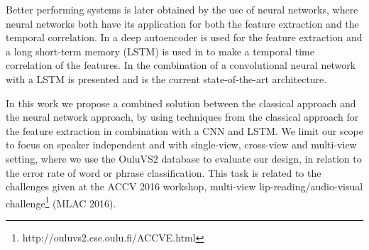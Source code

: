 Better performing systems is later obtained by the use of neural networks, where neural networks both have its application for both the feature extraction and the temporal correlation.
In \cite{Ngiam2011} a deep autoencoder is used for the feature extraction and a long short-term memory (LSTM) is used in \cite{Wand2016} to make a temporal time correlation of the features.
In \cite{Lee} the combination of a convolutional neural network with a LSTM is presented and is the current state-of-the-art architecture.

In this work we propose a combined solution between the classical approach and the neural network approach, by using techniques from the classical approach for the feature extraction in combination with a CNN and LSTM.
We limit our scope to focus on speaker independent and with single-view, cross-view and multi-view setting, where we use the OuluVS2 database\cite{Anina2015} to evaluate our design, in relation to the error rate of word or phrase classification.
This task is related to the challenges given at the ACCV 2016 workshop, multi-view lip-reading/audio-visual challenge\footnote{http://ouluvs2.cse.oulu.fi/ACCVE.html} (MLAC 2016).
